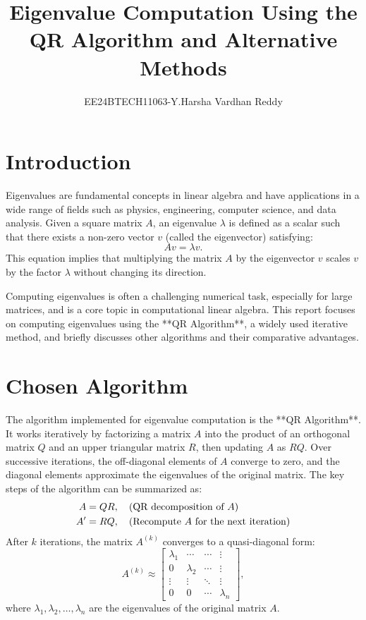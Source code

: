 \documentclass[12pt]{article}
\title{Eigenvalue Computation Using the QR Algorithm and Alternative Methods}
\author{EE24BTECH11063-Y.Harsha Vardhan Reddy}
\date{}
\begin{document}
\maketitle

\section*{Introduction}
Eigenvalues are fundamental concepts in linear algebra and have applications in a wide range of fields such as physics, engineering, computer science, and data analysis. Given a square matrix \( A \), an eigenvalue \( \lambda \) is defined as a scalar such that there exists a non-zero vector \( v \) (called the eigenvector) satisfying:
\begin{equation}
    A v = \lambda v.
\end{equation}
This equation implies that multiplying the matrix \( A \) by the eigenvector \( v \) scales \( v \) by the factor \( \lambda \) without changing its direction. 

Computing eigenvalues is often a challenging numerical task, especially for large matrices, and is a core topic in computational linear algebra. This report focuses on computing eigenvalues using the **QR Algorithm**, a widely used iterative method, and briefly discusses other algorithms and their comparative advantages.

\section*{Chosen Algorithm}
The algorithm implemented for eigenvalue computation is the **QR Algorithm**. It works iteratively by factorizing a matrix \( A \) into the product of an orthogonal matrix \( Q \) and an upper triangular matrix \( R \), then updating \( A \) as \( RQ \). Over successive iterations, the off-diagonal elements of \( A \) converge to zero, and the diagonal elements approximate the eigenvalues of the original matrix.
The key steps of the algorithm can be summarized as:
\begin{align}
    A &= QR, \quad \text{(QR decomposition of \( A \))} \\
    A' &= RQ, \quad \text{(Recompute \( A \) for the next iteration)}
\end{align}
After \( k \) iterations, the matrix \( A^{(k)} \) converges to a quasi-diagonal form:
\begin{equation}
    A^{(k)} \approx 
    \begin{bmatrix}
        \lambda_1 & \cdots & \cdots & \vdots \\
        0 & \lambda_2 & \cdots & \vdots \\
        \vdots & \vdots & \ddots & \vdots \\
        0 & 0 & \cdots & \lambda_n
    \end{bmatrix},
\end{equation}
where \( \lambda_1, \lambda_2, \dots, \lambda_n \) are the eigenvalues of the original matrix \( A \).
\end{document}
